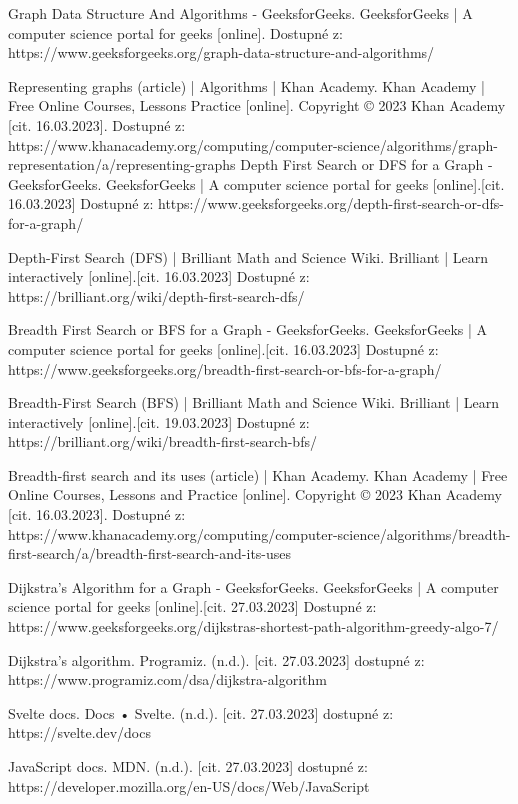 \documentclass[12pt, titlepage, a4paper]{article}
\begin{document}
\begin{thebibliography}{99}
    Graph Data Structure And Algorithms - GeeksforGeeks. GeeksforGeeks | A computer science 
    portal for geeks [online]. Dostupné z: https://www.geeksforgeeks.org/graph-data-structure-and-algorithms/

    Representing graphs (article) | Algorithms | Khan Academy. Khan Academy | Free Online Courses, 
    Lessons Practice [online]. Copyright © 2023 Khan Academy [cit. 16.03.2023]. Dostupné z: https://www.khanacademy.org/computing/computer-science/algorithms/graph-representation/a/representing-graphs
    Depth First Search or DFS for a Graph - GeeksforGeeks. GeeksforGeeks | A computer science portal for geeks [online].[cit. 16.03.2023] Dostupné z: https://www.geeksforgeeks.org/depth-first-search-or-dfs-for-a-graph/
    
    Depth-First Search (DFS) | Brilliant Math and Science Wiki. Brilliant | Learn interactively [online].[cit. 16.03.2023] Dostupné z: https://brilliant.org/wiki/depth-first-search-dfs/

    Breadth First Search or BFS for a Graph - GeeksforGeeks. GeeksforGeeks | A computer science portal for geeks [online].[cit. 16.03.2023] Dostupné z: https://www.geeksforgeeks.org/breadth-first-search-or-bfs-for-a-graph/

    Breadth-First Search (BFS) | Brilliant Math and Science Wiki. Brilliant | Learn interactively [online].[cit. 19.03.2023] Dostupné z: https://brilliant.org/wiki/breadth-first-search-bfs/

    Breadth-first search and its uses (article) | Khan Academy. Khan Academy | Free Online Courses, Lessons and Practice [online]. Copyright © 2023 Khan Academy [cit. 16.03.2023]. Dostupné z: https://www.khanacademy.org/computing/computer-science/algorithms/breadth-first-search/a/breadth-first-search-and-its-uses

    Dijkstra’s Algorithm for a Graph - GeeksforGeeks. GeeksforGeeks | A computer science portal for geeks [online].[cit. 27.03.2023] Dostupné z: https://www.geeksforgeeks.org/dijkstras-shortest-path-algorithm-greedy-algo-7/

    Dijkstra's algorithm. Programiz. (n.d.). [cit. 27.03.2023] dostupné z: https://www.programiz.com/dsa/dijkstra-algorithm 

    Svelte docs. Docs • Svelte. (n.d.). [cit. 27.03.2023] dostupné z: https://svelte.dev/docs 

    JavaScript docs. MDN. (n.d.). [cit. 27.03.2023] dostupné z: https://developer.mozilla.org/en-US/docs/Web/JavaScript 



\end{thebibliography}
\end{document}
